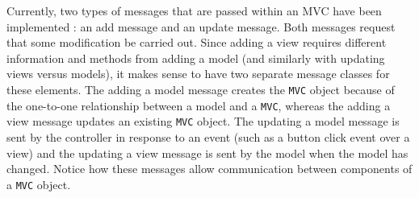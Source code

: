 \documentclass[11pt]{article}
\newcommand{\Robject}[1]{{\texttt{#1}}}
\newcommand{\Rclass}[1]{\texttt{#1}}
\begin{document}


Currently, two types of messages that are passed within an MVC have been
implemented : an add
message and an update message.  Both messages request that some
modification be carried out.  Since adding a view requires different
information and methods from adding a model (and similarly with
updating views versus models), it makes sense to have two separate
message classes for these elements.  The adding a model message creates the
\Robject{MVC} object because of the one-to-one relationship between a model
and a \Robject{MVC}, whereas the adding a view message updates an
existing \Robject{MVC} object.  The updating a model message is sent by the
controller in response to an event (such as a button click event over a view)
and the updating a view message is sent by the model when the model has
changed.  Notice how these messages allow communication between components
of a \Robject{MVC} object.
\end{document}
